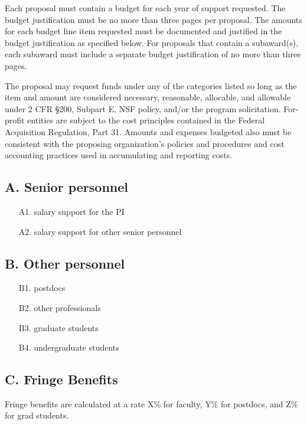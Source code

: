 Each proposal must contain a budget for each year of support
requested. The budget justification must be no more than three pages
per proposal. The amounts for each budget line item requested must be
documented and justified in the budget justification as specified
below. For proposals that contain a subaward(s), each subaward must
include a separate budget justification of no more than three pages.

The proposal may request funds under any of the categories listed so
long as the item and amount are considered necessary, reasonable,
allocable, and allowable under 2 CFR \S 200, Subpart E, NSF policy,
and/or the program solicitation. For-profit entities are subject to
the cost principles contained in the Federal Acquisition Regulation,
Part 31. Amounts and expenses budgeted also must be consistent with
the proposing organization's policies and procedures and cost
accounting practices used in accumulating and reporting costs.

\subsection*{A. Senior personnel}
\begin{itemize}
\item[A1.] salary support for the PI

\item[A2.] salary support for other senior personnel
\end{itemize}


\subsection*{B. Other personnel}
\begin{itemize}
\item[B1.] postdocs

\item[B2.] other professionals

\item[B3.] graduate students

\item[B4.] undergraduate students
\end{itemize}

\subsection*{C. Fringe Benefits}
Fringe benefits are calculated at a rate X\% for faculty, Y\% for
postdocs, and Z\% for grad students.


